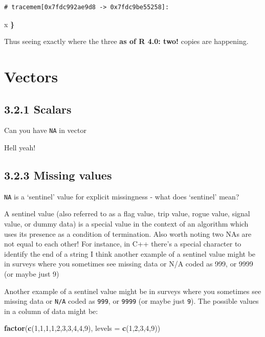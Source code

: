 \documentclass[]{book}
\newenvironment{Shaded}{\begin{snugshade}}{\end{snugshade}}
\newcommand{\DataTypeTok}[1]{\textcolor[rgb]{0.13,0.29,0.53}{#1}}
\newcommand{\DecValTok}[1]{\textcolor[rgb]{0.00,0.00,0.81}{#1}}
\newcommand{\ErrorTok}[1]{\textcolor[rgb]{0.64,0.00,0.00}{\textbf{#1}}}
\newcommand{\KeywordTok}[1]{\textcolor[rgb]{0.13,0.29,0.53}{\textbf{#1}}}
\newcommand{\NormalTok}[1]{#1}
\begin{document}
\begin{verbatim}
# tracemem[0x7fdc992ae9d8 -> 0x7fdc9be55258]: 
\end{verbatim}

\begin{Shaded}
\begin{Highlighting}[]
\NormalTok{  x}
\ErrorTok{\}}
\end{Highlighting}
\end{Shaded}

Thus seeing exactly where the three \textbf{as of R 4.0: two!} copies are happening.

\hypertarget{vectors}{%
\chapter{Vectors}\label{vectors}}

\hypertarget{scalars}{%
\section*{3.2.1 Scalars}\label{scalars}}

Can you have \texttt{NA} in vector

Hell yeah!

\hypertarget{missing-values}{%
\section*{3.2.3 Missing values}\label{missing-values}}

\texttt{NA} is a `sentinel' value for explicit missingness - what does `sentinel' mean?

A sentinel value (also referred to as a flag value, trip value, rogue value, signal value, or dummy data) is a special value in the context of an algorithm which uses its presence as a condition of termination. Also worth noting two NAs are not equal to each other! For instance, in C++ there's a special character to identify the end of a string I think another example of a sentinel value might be in surveys where you sometimes see missing data or N/A coded as 999, or 9999 (or maybe just 9)

Another example of a sentinel value might be in surveys where you sometimes see missing data or \texttt{N/A} coded as \texttt{999}, or \texttt{9999} (or maybe just \texttt{9}). The possible values in a column of data might be:

\begin{Shaded}
\begin{Highlighting}[]
\KeywordTok{factor}\NormalTok{(}\KeywordTok{c}\NormalTok{(}\DecValTok{1}\NormalTok{,}\DecValTok{1}\NormalTok{,}\DecValTok{1}\NormalTok{,}\DecValTok{1}\NormalTok{,}\DecValTok{2}\NormalTok{,}\DecValTok{3}\NormalTok{,}\DecValTok{3}\NormalTok{,}\DecValTok{4}\NormalTok{,}\DecValTok{4}\NormalTok{,}\DecValTok{9}\NormalTok{), }\DataTypeTok{levels =} \KeywordTok{c}\NormalTok{(}\DecValTok{1}\NormalTok{,}\DecValTok{2}\NormalTok{,}\DecValTok{3}\NormalTok{,}\DecValTok{4}\NormalTok{,}\DecValTok{9}\NormalTok{))}
\end{Highlighting}
\end{Shaded}
\end{document}
